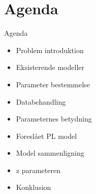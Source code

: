 \section{Agenda}
\begin{frame}{Agenda}
\begin{itemize}
\item Problem introduktion
\item Eksisterende modeller
\item Parameter bestemmelse
\item Databehandling
\item Parameternes betydning
\item Foreslået PL model
\item Model sammenligning
\item z parameteren
\item Konklusion
\end{itemize}
\end{frame}
